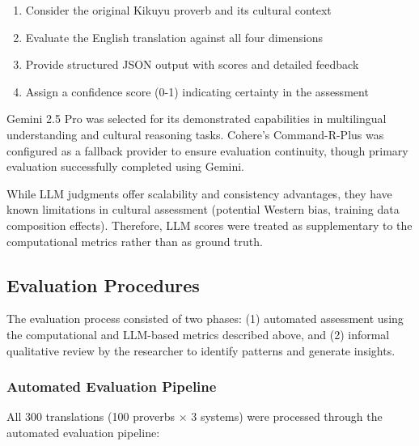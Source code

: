 \begin{enumerate}
    \item Consider the original Kikuyu proverb and its cultural context
    \item Evaluate the English translation against all four dimensions
    \item Provide structured JSON output with scores and detailed feedback
    \item Assign a confidence score (0-1) indicating certainty in the assessment
\end{enumerate}

Gemini 2.5 Pro was selected for its demonstrated capabilities in multilingual understanding and cultural reasoning tasks. Cohere's Command-R-Plus was configured as a fallback provider to ensure evaluation continuity, though primary evaluation successfully completed using Gemini.

While LLM judgments offer scalability and consistency advantages, they have known limitations in cultural assessment (potential Western bias, training data composition effects). Therefore, LLM scores were treated as supplementary to the computational metrics rather than as ground truth.

\subsection{Evaluation Procedures}
\label{subsec:eval_procedures}

The evaluation process consisted of two phases: (1) automated assessment using the computational and LLM-based metrics described above, and (2) informal qualitative review by the researcher to identify patterns and generate insights.

\subsubsection{Automated Evaluation Pipeline}
\label{subsubsec:automated_pipeline}

All 300 translations (100 proverbs × 3 systems) were processed through the automated evaluation pipeline:

